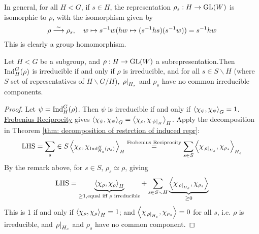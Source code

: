 \begin{remark}
    In general, for all $H < G$, if $s \in H$, the representation $\rho_s : H \to \mathrm{GL}(W)$ is isomorphic to $\rho$, with the isomorphism given by
    \[
        \rho \overset{\sim}{\longrightarrow} \rho_s, \quad w \mapsto s^{-1}w (hw \mapsto (s^{-1}hs)(s^{-1}w)) = s^{-1} hw
    \]
    This is clearly a group homomorphism.
\end{remark}

\begin{theorem}
    Let $H < G$ be a subgroup, and $\rho: H \to \mathrm{GL}(W)$ a subrepresentation.Then $\mathrm{Ind}_H^G (\rho)$ is irreducible if and only if $\rho$ is irreducible, and for all $s \in S \smallsetminus H$ (where $S$ set of representatives of $H \smallsetminus G / H$), $\left.\rho\right|_{H_s}$ and $\rho_s$ have no common irreducible components.
\end{theorem}

\begin{proof}
    Let $\psi = \mathrm{Ind}_H^G (\rho)$. Then $\psi$ is irreducible if and only if $\left\langle \chi_{\psi}, \chi_{\psi} \right\rangle_G = 1$. \hyperref[thm: Frobenius Reciprocity]{Frobenius Reciprocity} gives $\left\langle \chi_{\psi}, \chi_{\psi} \right\rangle_G = \left\langle \chi_{\rho}, \chi_{\left.\psi\right|_{H}} \right\rangle_H$. Apply the decomposition in Theorem \ref{thm: decomposition of restrction of induced repr}:
    \[
        \text{LHS} = \sum_s \in S \left\langle \chi_{\rho}, \chi_{\mathrm{Ind}_{H_s}^H (\rho_s)} \right\rangle_H \overset{\text{Frobenius Reciprocity}}{=} \sum_{s \in S} \left\langle \chi_{\left.\rho\right|_{H_s}}, \chi_{\rho_s} \right\rangle_{H_s}
    \]
    By the remark above, for $s \in S$, $\rho_s \simeq \rho$, giving
    \[
        \text{LHS} = \underbrace{\left\langle \chi_{\rho}, \chi_{\rho} \right\rangle_H}_{\geq 1, \text{equal iff $\rho$ irreducible}} + \sum_{s \in S \smallsetminus H} \underbrace{\left\langle \chi_{\left.\rho\right|_{H_s}}, \chi_{\rho_s} \right\rangle}_{\geq 0}
    \]
    This is 1 if and only if $\left\langle \chi_{\rho}, \chi_{\rho} \right\rangle_H = 1$; and $\left\langle \chi_{\left.\rho\right|_{H_s}}, \chi_{\rho_s} \right\rangle = 0$ for all $s$, i.e. $\rho$ is irreducible, and $\left.\rho\right|_{H_s}$ and $\rho_s$ have no common component.
\end{proof}
